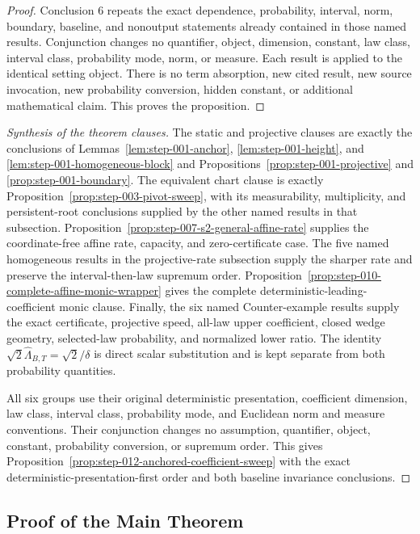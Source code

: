 \begin{proof}
Conclusion 6 repeats the exact dependence, probability, interval, norm, boundary, baseline, and nonoutput
statements already contained in those named results. Conjunction changes no quantifier, object, dimension,
constant, law class, interval class, probability mode, norm, or measure. Each result is applied to the
identical setting object. There is no term absorption, new cited result, new source invocation,
new probability conversion, hidden constant, or additional
mathematical claim. This proves the proposition. 
\end{proof}

\begin{proof}[Synthesis of the theorem clauses]
The static and projective clauses are exactly the conclusions of
Lemmas~\ref{lem:step-001-anchor}, \ref{lem:step-001-height}, and
\ref{lem:step-001-homogeneous-block} and
Propositions~\ref{prop:step-001-projective} and
\ref{prop:step-001-boundary}.  The equivalent chart clause is exactly
Proposition~\ref{prop:step-003-pivot-sweep}, with its measurability,
multiplicity, and persistent-root conclusions supplied by the other named
results in that subsection.  Proposition~\ref{prop:step-007-s2-general-affine-rate}
supplies the coordinate-free affine rate, capacity, and zero-certificate
case.  The five named homogeneous results in the projective-rate subsection
supply the sharper rate and preserve the interval-then-law supremum order.
Proposition~\ref{prop:step-010-complete-affine-monic-wrapper} gives the complete
deterministic-leading-coefficient monic clause.
Finally, the six named Counter-example results supply the exact certificate,
projective speed, all-law upper coefficient, closed wedge geometry, selected-law
probability, and normalized lower ratio.  The identity
$\sqrt2\widehat\Lambda_{B,T}=\sqrt2/\delta$ is direct scalar substitution
and is kept separate from both probability quantities.

All six groups use their original deterministic presentation, coefficient
dimension, law class, interval class, probability mode, and Euclidean norm
and measure conventions. Their conjunction changes no assumption, quantifier,
object, constant, probability conversion,
or supremum order.  This gives Proposition~\ref{prop:step-012-anchored-coefficient-sweep}
with the exact deterministic-presentation-first order and both baseline
invariance conclusions.
\end{proof}

\subsection{Proof of the Main Theorem}\label{app:main-proof}


